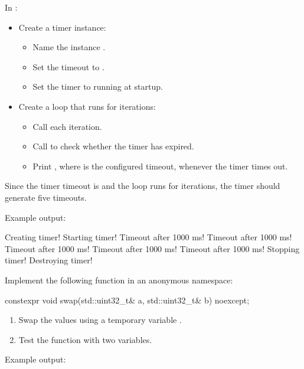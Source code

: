 In :
\begin{itemize}
  \item Create a timer instance:
  \begin{itemize}
    \item Name the instance .
    \item Set the timeout to .
    \item Set the timer to running at startup.
  \end{itemize}
  \item Create a loop that runs for  iterations:
  \begin{itemize}
    \item Call  each iteration.
    \item Call  to check whether the timer has expired.
    \item Print , where  is the configured timeout, whenever the
      timer times out.
  \end{itemize}
\end{itemize}
Since the timer timeout is  and the loop runs for  iterations, the timer
should generate five timeouts.

Example output:

\begin{console}
Creating timer!
Starting timer!
Timeout after 1000 ms!
Timeout after 1000 ms!
Timeout after 1000 ms!
Timeout after 1000 ms!
Timeout after 1000 ms!
Stopping timer!
Destroying timer!
\end{console}

\label{c1:set:3}

\label{c1:ex:3.1}
Implement the following function in an anonymous namespace:

\begin{cppcode}
constexpr void swap(std::uint32_t& a, std::uint32_t& b) noexcept;
\end{cppcode}

\begin{enumerate}
  \item Swap the values using a temporary variable .
  \item Test the function with two variables.
\end{enumerate}
Example output:

